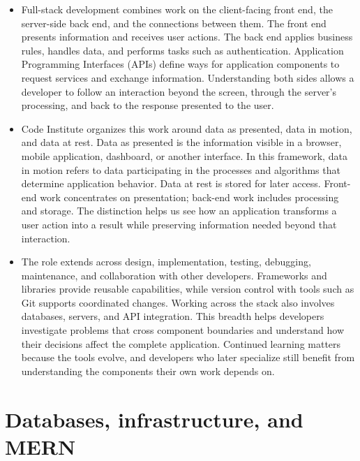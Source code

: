 \documentclass[10pt]{article}
\begin{document}
\begin{itemize}[leftmargin=1.25em, itemsep=0.3em, parsep=0pt, topsep=0pt]
    \item Full-stack development combines work on the client-facing front end, the server-side back end, and the connections between them. The front end presents information and receives user actions. The back end applies business rules, handles data, and performs tasks such as authentication. Application Programming Interfaces (APIs) define ways for application components to request services and exchange information. Understanding both sides allows a developer to follow an interaction beyond the screen, through the server's processing, and back to the response presented to the user.

    \item Code Institute organizes this work around data as presented, data in motion, and data at rest. Data as presented is the information visible in a browser, mobile application, dashboard, or another interface. In this framework, data in motion refers to data participating in the processes and algorithms that determine application behavior. Data at rest is stored for later access. Front-end work concentrates on presentation; back-end work includes processing and storage. The distinction helps us see how an application transforms a user action into a result while preserving information needed beyond that interaction.

    \item The role extends across design, implementation, testing, debugging, maintenance, and collaboration with other developers. Frameworks and libraries provide reusable capabilities, while version control with tools such as Git supports coordinated changes. Working across the stack also involves databases, servers, and API integration. This breadth helps developers investigate problems that cross component boundaries and understand how their decisions affect the complete application. Continued learning matters because the tools evolve, and developers who later specialize still benefit from understanding the components their own work depends on.
\end{itemize}

\section*{Databases, infrastructure, and MERN}
\end{document}

